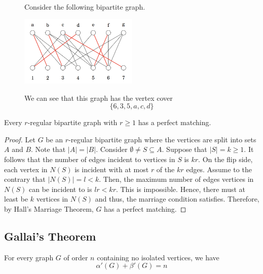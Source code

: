 \begin{figure}[ht]
\begin{nexample}
  Consider the following bipartite graph.
  \begin{center}
    \includegraphics[width=0.5\textwidth]{figures/l08/matching-vertex-2}
  \end{center}
  We can see that this graph has the vertex cover
  \[ \{6, 3, 5, a, c, d\} \]
\end{nexample}
\end{figure}

\begin{theorem}
  Every \(r\)-regular bipartite graph with \(r \geq 1\) has a
  perfect matching.
\end{theorem}

\begin{proof}
  Let \(G\) be an \(r\)-regular bipartite graph where the vertices are split
  into sets \(A\) and \(B\). Note that \(|A| = |B|\). Consider \(\emptyset \neq S \subseteq A\).
  Suppose that \(|S| = k \geq 1\). It follows that the number of edges incident 
  to vertices in \(S\) is \(kr\). On the flip side, each vertex in \(N(S)\) is
  incident with at most \(r\) of the \(kr\) edges. Assume to the contrary that 
  \(|N(S)| = l < k\). Then, the maximum number of edges vertices in \(N(S)\) 
  can be incident to is \(lr < kr\). This is impossible. Hence, there must at
  least be \(k\) vertices in \(N(S)\) and thus, the marriage condition
  satisfies. Therefore, by Hall's Marriage Theorem, \(G\) has a perfect matching.
\end{proof}

\subsection{Gallai's Theorem}

\begin{theorem}[Gallai, 1959]
  For every graph \(G\) of order \(n\) containing no isolated vertices, we have
  \[ \alpha'(G) + \beta'(G) = n \]
\end{theorem}

